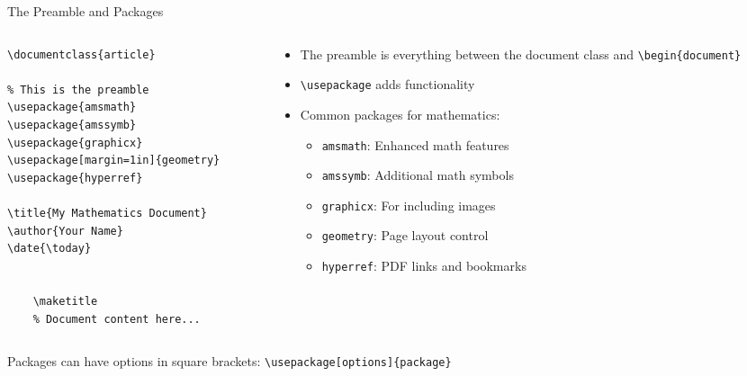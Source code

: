 \begin{frame}[fragile]{The Preamble and Packages}
    \begin{columns}
        \begin{column}{0.5\textwidth}
            \begin{lstlisting}
\documentclass{article}

% This is the preamble
\usepackage{amsmath}
\usepackage{amssymb}
\usepackage{graphicx}
\usepackage[margin=1in]{geometry}
\usepackage{hyperref}

\title{My Mathematics Document}
\author{Your Name}
\date{\today}


    \maketitle
    % Document content here...

            \end{lstlisting}
        \end{column}
        
        \begin{column}{0.5\textwidth}
            \begin{itemize}
                \item The \alert{preamble} is everything between the document class and \texttt{\textbackslash begin\{document\}}
                \item \texttt{\textbackslash usepackage} adds functionality
                \item Common packages for mathematics:
                \begin{itemize}
                    \item \texttt{amsmath}: Enhanced math features
                    \item \texttt{amssymb}: Additional math symbols
                    \item \texttt{graphicx}: For including images
                    \item \texttt{geometry}: Page layout control
                    \item \texttt{hyperref}: PDF links and bookmarks
                \end{itemize}
            \end{itemize}
        \end{column}
    \end{columns}
    
    \begin{tip}
        Packages can have options in square brackets: \texttt{\textbackslash usepackage[options]\{package\}}
    \end{tip}
\end{frame}

